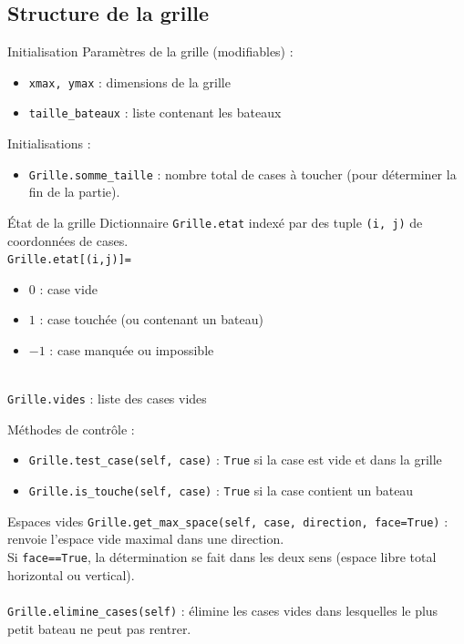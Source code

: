 \subsection{Structure de la grille}
\begin{frame}{Initialisation}
Paramètres de la grille (modifiables) :
\begin{itemize}
\item \texttt{xmax, ymax} : dimensions de la grille
\item \texttt{taille\_bateaux} : liste contenant les bateaux
\end{itemize}\pause
Initialisations :
\begin{itemize}
\item \texttt{Grille.somme\_taille} : nombre total de cases à toucher (pour déterminer la fin de la partie).
\end{itemize}
\end{frame}

\begin{frame}{État de la grille}
Dictionnaire \texttt{Grille.etat} indexé par des tuple \texttt{(i, j)} de coordonnées de cases.\\ \pause
\texttt{Grille.etat[(i,j)]=}
\begin{itemize}
\item $0$ : case vide
\item $1$ : case touchée (ou contenant un bateau)
\item $-1$ : case manquée ou impossible
\end{itemize}
~\\ \pause
\texttt{Grille.vides} : liste des cases vides
\end{frame}

\begin{frame}
Méthodes de contrôle :
\begin{itemize}
\item \texttt{Grille.test\_case(self, case)} : \texttt{True} si la case est vide et dans la grille
\item \texttt{Grille.is\_touche(self, case)} : \texttt{True} si la case contient un bateau
\end{itemize}
\end{frame}


\begin{frame}{Espaces vides}
\texttt{Grille.get\_max\_space(self, case, direction, face=True)} : renvoie l'espace vide maximal dans une direction.\\
Si \texttt{face==True}, la détermination se fait dans les deux sens (espace libre total horizontal ou vertical).\\~\\ \pause
\texttt{Grille.elimine\_cases(self)} : élimine les cases vides dans lesquelles le plus petit bateau ne peut pas rentrer.
\end{frame}

